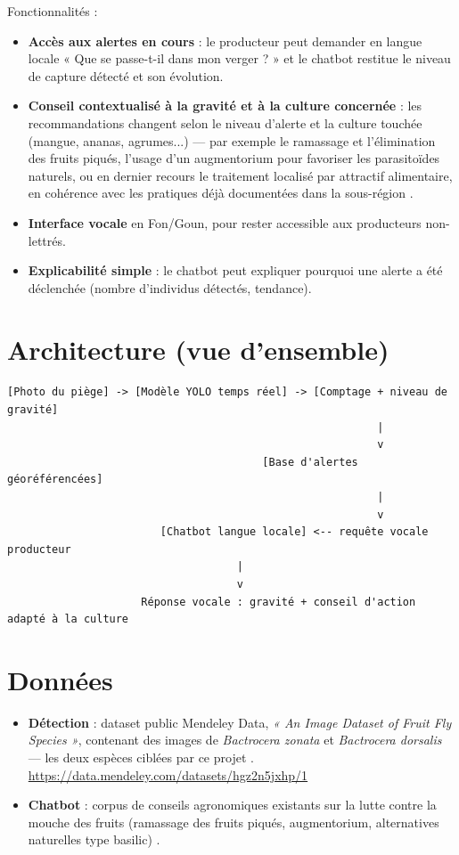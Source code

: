 \documentclass[11pt,a4paper]{article}
\begin{document}
Fonctionnalités :
\begin{itemize}
    \item \textbf{Accès aux alertes en cours} : le producteur peut demander en langue locale « Que se passe-t-il dans mon verger ? » et le chatbot restitue le niveau de capture détecté et son évolution.
    \item \textbf{Conseil contextualisé à la gravité et à la culture concernée} : les recommandations changent selon le niveau d'alerte et la culture touchée (mangue, ananas, agrumes...) — par exemple le ramassage et l'élimination des fruits piqués, l'usage d'un augmentorium pour favoriser les parasitoïdes naturels, ou en dernier recours le traitement localisé par attractif alimentaire, en cohérence avec les pratiques déjà documentées dans la sous-région \cite{cotedivoire}.
    \item \textbf{Interface vocale} en Fon/Goun, pour rester accessible aux producteurs non-lettrés.
    \item \textbf{Explicabilité simple} : le chatbot peut expliquer pourquoi une alerte a été déclenchée (nombre d'individus détectés, tendance).
\end{itemize}

\section{Architecture (vue d'ensemble)}

\begin{verbatim}
[Photo du piège] -> [Modèle YOLO temps réel] -> [Comptage + niveau de gravité]
                                                          |
                                                          v
                                        [Base d'alertes géoréférencées]
                                                          |
                                                          v
                        [Chatbot langue locale] <-- requête vocale producteur
                                    |
                                    v
                     Réponse vocale : gravité + conseil d'action adapté à la culture
\end{verbatim}

\section{Données}

\begin{itemize}
    \item \textbf{Détection} : dataset public Mendeley Data, \textit{« An Image Dataset of Fruit Fly Species »}, contenant des images de \textit{Bactrocera zonata} et \textit{Bactrocera dorsalis} — les deux espèces ciblées par ce projet \cite{mendeley}. \\ \url{https://data.mendeley.com/datasets/hgz2n5jxhp/1}
    \item \textbf{Chatbot} : corpus de conseils agronomiques existants sur la lutte contre la mouche des fruits (ramassage des fruits piqués, augmentorium, alternatives naturelles type basilic) \cite{cotedivoire, daaf}.
\end{itemize}
\end{document}
